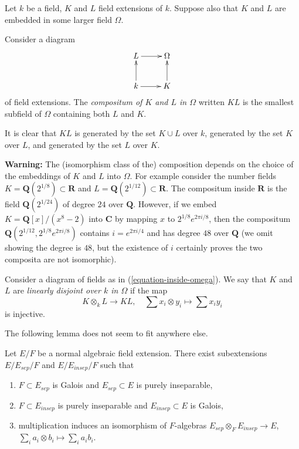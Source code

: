 \noindent
Let $k$ be a field, $K$ and $L$ field extensions of $k$.
Suppose also that $K$ and $L$ are embedded in some larger field $\Omega$.

\begin{definition}
\label{definition-compositum}
Consider a diagram
\begin{equation}
\label{equation-inside-omega}
\vcenter{
\xymatrix{
L \ar[r] & \Omega \\
k \ar[r] \ar[u] & K \ar[u]
}
}
\end{equation}
of field extensions. The {\it compositum of $K$ and $L$ in $\Omega$}
written $KL$ is the smallest subfield of $\Omega$ containing both
$L$ and $K$.
\end{definition}

\noindent
It is clear that $KL$ is generated by the set $K \cup L$ over $k$,
generated by the set $K$ over $L$, and generated by the set $L$ over $K$.

\medskip\noindent
{\bf Warning:} The (isomorphism class of the) composition depends on
the choice of the embeddings of $K$ and $L$ into $\Omega$. For example
consider the number fields $K = \mathbf{Q}(2^{1/8}) \subset \mathbf{R}$ and
$L = \mathbf{Q}(2^{1/12}) \subset \mathbf{R}$. The compositum inside
$\mathbf{R}$ is the field $\mathbf{Q}(2^{1/24})$ of degree $24$ over
$\mathbf{Q}$. However, if we embed $K = \mathbf{Q}[x]/(x^8 - 2)$ into
$\mathbf{C}$ by mapping $x$ to $2^{1/8}e^{2\pi i/8}$, then the compositum
$\mathbf{Q}(2^{1/12}, 2^{1/8}e^{2\pi i/8})$ contains $i = e^{2\pi i/4}$ and has
degree $48$ over $\mathbf{Q}$ (we omit showing the degree is $48$, but
the existence of $i$ certainly proves the two composita are not isomorphic).

\begin{definition}
\label{definition-linearly-disjoint}
Consider a diagram of fields as in (\ref{equation-inside-omega}).
We say that $K$ and $L$ are {\it linearly disjoint over $k$ in $\Omega$}
if the map
$$
K \otimes_k L \longrightarrow KL,\quad
\sum x_i \otimes y_i \longmapsto \sum x_i y_i
$$
is injective.
\end{definition}

\noindent
The following lemma does not seem to fit anywhere else.

\begin{lemma}
\label{lemma-normal-case}
Let $E/F$ be a normal algebraic field extension. There exist subextensions
$E / E_{sep} /F$ and $E / E_{insep} / F$ such that
\begin{enumerate}
\item $F \subset E_{sep}$ is Galois and $E_{sep} \subset E$
is purely inseparable,
\item $F \subset E_{insep}$ is purely inseparable and $E_{insep} \subset E$
is Galois,
\item multiplication induces an isomorphism of $F$-algebras
$E_{sep}\otimes_F E_{insep}\longrightarrow E$,
$\sum_i a_i\otimes b_i\longmapsto\sum_i a_i b_i$.
\end{enumerate}
\end{lemma}

